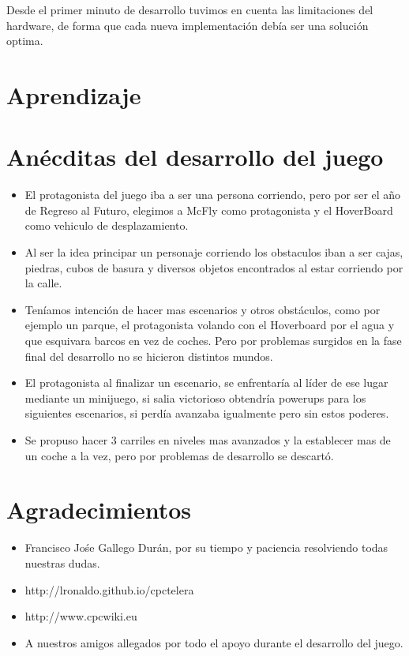\documentclass[11pt, spanish]{article}
\begin{document}
Desde el primer minuto de desarrollo tuvimos en cuenta las limitaciones del hardware, de forma que cada nueva implementación debía ser una solución optima.

\section{Aprendizaje}


\section{Anécditas del desarrollo del juego}
\begin{itemize}
	\item El protagonista del juego iba a ser una persona corriendo, pero por ser el año de Regreso al Futuro, elegimos a McFly como protagonista y el HoverBoard como vehiculo de desplazamiento.
	\item Al ser la idea principar un personaje corriendo los obstaculos iban a ser cajas, piedras, cubos de basura y diversos objetos encontrados al estar corriendo por la calle.
	\item Teníamos intención de hacer mas escenarios y otros obstáculos, como por ejemplo un parque, el protagonista volando con el Hoverboard por el agua y que esquivara barcos en vez de coches. Pero por problemas surgidos en la fase final del desarrollo no se hicieron distintos mundos.
	\item El protagonista al finalizar un escenario, se enfrentaría al líder de ese lugar mediante un minijuego, si salia victorioso obtendría powerups para los siguientes escenarios, si perdía avanzaba igualmente pero sin estos poderes.
	\item Se propuso hacer 3 carriles en niveles mas avanzados y la establecer mas de un coche a la vez, pero por problemas de desarrollo se descartó.
\end{itemize}
\section{Agradecimientos}
\begin{itemize}
	\item Francisco Jośe Gallego Durán, por su tiempo y paciencia resolviendo todas nuestras dudas.
	\item http://lronaldo.github.io/cpctelera
	\item http://www.cpcwiki.eu
	\item A nuestros amigos allegados por todo el apoyo durante el desarrollo del juego.
\end{itemize}
\end{document}

